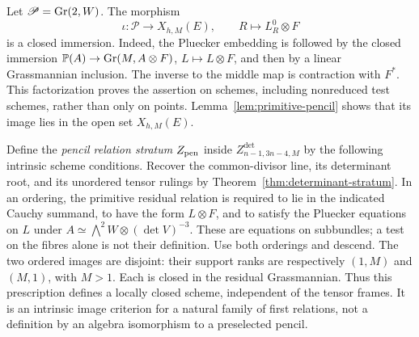 \documentclass[11pt,reqno]{amsart}
\numberwithin{equation}{section}
\theoremstyle{definition}\newtheorem{definition}[theorem]{Definition}
\theoremstyle{remark}\newtheorem{remark}[theorem]{Remark}
\newcommand{\Pj}{\mathbb P}\newcommand{\A}{\mathbb A}
\begin{document}
Let \(\mathscr P=\operatorname{Gr}(2,W)\).  The morphism
\begin{equation}\label{eq:primitive-pencil-embedding}
 \iota:\mathscr P\longrightarrow X_{h,M}(E),
                 \qquad R\longmapsto L_R^0\otimes F
\end{equation}
is a closed immersion.  Indeed, the Pluecker embedding is followed
by the closed immersion \(\Pj(A)\to\Gr(M,A\otimes F)\),
\(L\mapsto L\otimes F\), and then by a linear Grassmannian
inclusion.  The inverse to the middle map is contraction with
\(F^*\).  This factorization proves the assertion on schemes,
including nonreduced test schemes, rather than only on points.
Lemma~\ref{lem:primitive-pencil} shows that its image lies in the
open set \(X_{h,M}(E)\).

Define the \emph{pencil relation stratum} \(Z_{\rm pen}\) inside
\(Z^{\det}_{n-1,3n-4,M}\) by the following intrinsic scheme
conditions.  Recover the common-divisor line, its determinant root,
and its unordered tensor rulings by
Theorem~\ref{thm:determinant-stratum}.  In an ordering, the primitive
residual relation is required to lie in the indicated Cauchy
summand, to have the form \(L\otimes F\), and to satisfy the
Pluecker equations on \(L\) under
\(A\simeq\bigwedge^2W\otimes(\det V)^{-3}\).
These are equations on subbundles; a test on the fibres alone is
not their definition.  Use both orderings and descend.  The two
ordered images are disjoint: their support ranks are respectively
\((1,M)\) and \((M,1)\), with \(M>1\).  Each is closed in the
residual Grassmannian.  Thus this prescription defines a locally
closed scheme, independent of the tensor frames.  It is an
intrinsic image criterion for a natural family of first relations,
not a definition by an algebra isomorphism to a preselected pencil.
\end{document}
